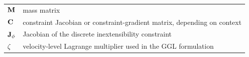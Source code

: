 \begin{longtable}[l]{p{} p{}}
    $\mathbf{M}$               & mass matrix                                                             \\
    $\mathbf{C}$               & constraint Jacobian or constraint-gradient matrix, depending on context \\
    $\mathbf{J}_\phi$          & Jacobian of the discrete inextensibility constraint                     \\
    $\zeta$                & velocity-level Lagrange multiplier used in the GGL formulation          \\
\end{longtable}
\def\arraystretch{1}
